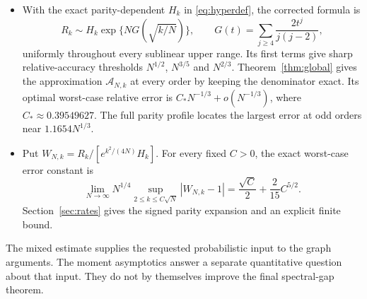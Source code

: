 \begin{itemize}
\[\]
where $\shc(z)=\sinh(z)/z$ for $z\ne0$ and $\shc(0)=1$. Theorem~\ref{thm:critical} gives a uniform finite-size error.
\item With the exact parity-dependent $H_k$ in \eqref{eq:hyperdef}, the corrected formula is
\[
R_k\sim H_k\exp\{NG(\sqrt{k/N})\},\qquad
G(t)=\sum_{j\ge4}\frac{2t^j}{j(j-2)},
\]
uniformly throughout every sublinear upper range. Its first terms give sharp relative-accuracy thresholds $N^{1/2}$, $N^{3/5}$ and $N^{2/3}$. Theorem~\ref{thm:global} gives the approximation $\mathcal A_{N,k}$ at every order by keeping the denominator exact. Its optimal worst-case relative error is $C_*N^{-1/3}+o(N^{-1/3})$, where $C_*\approx0.39549627$. The full parity profile locates the largest error at odd orders near $1.1654N^{1/3}$.
\item Put $W_{N,k}=R_k/[e^{k^2/(4N)}H_k]$. For every fixed $C>0$, the exact worst-case error constant is
\[
\lim_{N\to\infty}N^{1/4}
\sup_{2\le k\le C\sqrt N}|W_{N,k}-1|
=\frac{\sqrt C}{2}+\frac{2}{15}C^{5/2}.
\]
Section~\ref{sec:rates} gives the signed parity expansion and an explicit finite bound.
\end{itemize}

The mixed estimate supplies the requested probabilistic input to the graph arguments. The moment asymptotics answer a separate quantitative question about that input. They do not by themselves improve the final spectral-gap theorem.
